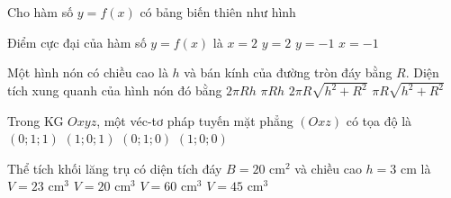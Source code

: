 \begin{ex}%
Cho hàm số $y=f(x)$ có bảng biến thiên như hình 
\begin{center}
\end{center}
Điểm cực đại của hàm số $y=f(x)$ là
\choice
{$x=2$}
{$y=2$}
{$y=-1$}
{\True $x=-1$}
\end{ex}

\begin{ex}%
Một hình nón có chiều cao là $h$ và bán kính của đường tròn đáy bằng $R$. Diện tích xung quanh của hình nón đó bằng
\choice
{$2 \pi R h$}
{$\pi R h$}
{$2 \pi R \sqrt{h^2+R^2}$}
{\True $\pi R \sqrt{h^2+R^2}$}
\end{ex}

\begin{ex}%
Trong KG $Oxyz$, một véc-tơ pháp tuyến mặt phẳng $(Oxz)$ có tọa độ là
\choice
{$(0; 1; 1)$}
{$(1; 0; 1)$}
{\True $(0; 1; 0)$}
{$(1; 0; 0)$}
\end{ex}

\begin{ex}%
Thể tích khối lăng trụ có diện tích đáy $B=20 \text{~cm}^2$ và chiều cao $h=3 \text{~cm}$ là
\choice
{$V=23 \text{~cm}^3$}
{$V=20 \text{~cm}^3$}
{\True $V=60 \text{~cm}^3$}
{$V=45 \text{~cm}^3$}
\end{ex}

